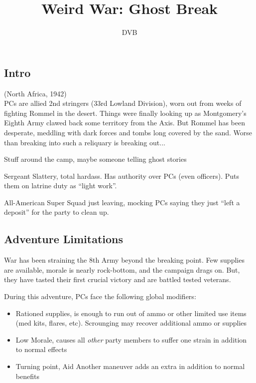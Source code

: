 \documentclass{book}
\title{Weird War: Ghost Break}
\author{DVB}
\begin{document}
\maketitle

\begin{multicols}{2}
\section{Intro}
(North Africa, 1942)\\

    PCs are allied 2nd stringers (33rd Lowland Division), worn out from weeks of fighting Rommel in the desert.  Things were finally looking up as Montgomery's Eighth Army clawed back some territory from the Axis.  But Rommel has been desperate, meddling with dark forces and tombs long covered by the sand.  Worse than breaking into such a reliquary is breaking out...

Stuff around the camp, maybe someone telling ghost stories

    Sergeant Slattery, total hardass.  Has authority over PCs (even officers).  Puts them on latrine duty as ``light work''.

All-American Super Squad just leaving, mocking PCs saying they just ``left a deposit'' for the party to clean up.

\subsection{Adventure Limitations}

    War has been straining the 8th Army beyond the breaking point.  Few supplies are available, morale is nearly rock-bottom, and the campaign drags on.  But, they have tasted their first crucial victory and are battled tested veterans.
    
    During this adventure, PCs face the following global modifiers:

    \begin{itemize}
        \item Rationed supplies, \Threat\Threat is enough to run out of ammo or other limited use items (med kits, flares, etc).  Scrounging may recover additional ammo or supplies
        \item Low Morale, \Despair causes all \emph{other} party members to suffer one strain in addition to normal effects
        \item Turning point, Aid Another maneuver adds an extra \Advantage\Advantage in addition to normal benefits
    \end{itemize}


\end{multicols}
\end{document}
